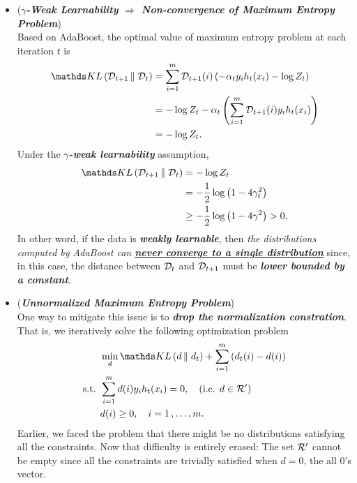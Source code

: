 \documentclass[11pt]{article}
\begin{document}
\begin{itemize}
\item \begin{remark} (\textbf{\emph{$\gamma$-Weak Learnability $\Rightarrow$ Non-convergence of Maximum Entropy Problem}})\\
Based on AdaBoost, the optimal value of maximum entropy problem at each iteration $t$ is 
\begin{align*}
\kl{\cD_{t+1}}{\cD_t} &= \sum_{i=1}^{m}\cD_{t+1}(i)\paren{-\alpha_t y_i h_t(x_i) - \log Z_t}\\
&= -\log Z_t -\alpha_t  \paren{ \sum_{i=1}^{m}\cD_{t+1}(i) y_i h_t(x_i)}\\
&=  -\log Z_t.
\end{align*} Under the  \emph{\textbf{$\gamma$-weak learnability}} assumption, 
\begin{align*}
\kl{\cD_{t+1}}{\cD_t} &=  -\log Z_t \\
&= - \frac{1}{2} \log\paren{1- 4\gamma_t^2} \\
&\ge - \frac{1}{2} \log\paren{1- 4\gamma^2} > 0, 
\end{align*}
In other word,  if the data is \emph{\textbf{weakly learnable}}, then \emph{the distributions computed by AdaBoost can \textbf{\underline{never converge to a single distribution}}} since, in this case, the distance between ${\mathcal D}_t$ and ${\mathcal D}_{t+1}$ must be \emph{\textbf{lower bounded by a constant}}. 
\end{remark}




\item \begin{remark}(\textbf{\emph{Unnormalized Maximum Entropy Problem}})\\
One way to mitigate this issue is to \emph{\textbf{drop the normalization constration}}. That is, we iteratively solve the following optimization problem
\begin{align}
&\min_{d} \kl{d}{d_t} + \sum_{i=1}^{m}\paren{d_t(i) - d(i)} \label{eqn: max_ent_unnormalized}\\
\text{s.t. }& \sum_{i=1}^{m}d(i)y_i h_t(x_i) = 0,  \quad (\text{i.e. }d \in \cR')\nonumber\\
&d(i) \ge 0, \quad i=1 \xdotx{,} m. \nonumber
\end{align} Earlier, we faced the problem that there might be no distributions satisfying all the constraints. Now that difficulty is entirely erased: The set ${\mathcal R}'$ cannot be empty since all the constraints are trivially satisfied when $d = 0$, the all $0$'s vector. 


\end{remark}
\end{itemize}
\end{document}
